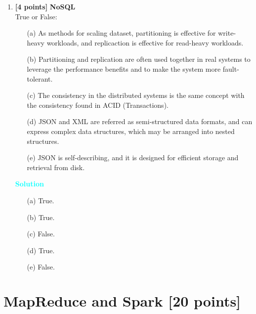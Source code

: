 \documentclass[10pt]{article}
\newenvironment{solution}
    { \begin{mdframed}[backgroundcolor=gray!10] \textcolor{cyan}{\textbf{Solution}} \\}
    {  \end{mdframed}}
\begin{document}
\begin{enumerate}
		  	\item \textbf{[4 points]} \textbf{NoSQL} \\
		  	True or False:
	      \begin{itemize}
		      \item[(a)] As methods for scaling dataset, partitioning is effective for write-heavy workloads, and replicaction is effective for read-heavy workloads.
		      \item[(b)] Partitioning and replication are often used together in real systems to leverage the performance
			  benefits and to make the system more fault-tolerant.
		      \item[(c)] The consistency in the distributed systems is the same concept with the consistency found in ACID (Transactions).
		      \item[(d)] JSON and XML are referred as semi-structured data formats, and can express complex data structures, which may be arranged into nested structures.
		      \item[(e)] JSON is self-describing, and it is designed for efficient storage and retrieval from disk.
	      \end{itemize}
	      \begin{solution}
		      \begin{itemize}
			      \item[(a)] True.
			      \item[(b)] True.
			      \item[(c)] False.
			      \item[(d)] True.
			      \item[(e)] False.
		      \end{itemize}
	      \end{solution}

\end{enumerate}


\newpage
\section{MapReduce and Spark \textbf{[20 points]}}
\end{document}
